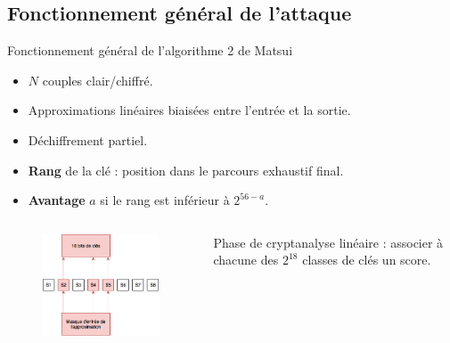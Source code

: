 \documentclass{beamer}
\begin{document}
\subsection{Fonctionnement général de l'attaque}
\begin{frame}{Fonctionnement général de l'algorithme 2 de Matsui}
	\begin{itemize}
		\item $N$ couples clair/chiffré.
		\item Approximations linéaires biaisées entre l'entrée et la sortie.
		\item Déchiffrement partiel.
		\item \textbf{Rang} de la clé : position dans le parcours exhaustif final.
		\item \textbf{Avantage} $a$ si le rang est inférieur à $2^{56-a}$.
	\end{itemize}

	\vspace*{-1cm}
	\begin{columns}
		\begin{column}{0.5\textwidth}
	\begin{figure}
		\centering
		\includegraphics[scale=0.5]{partiel}
	\end{figure}
		\end{column}
		\begin{column}{0.45\textwidth}
			Phase de cryptanalyse linéaire : associer à chacune des $2^{18}$ classes de clés un score.
		\end{column}
	\end{columns}

\end{frame}
\end{document}
